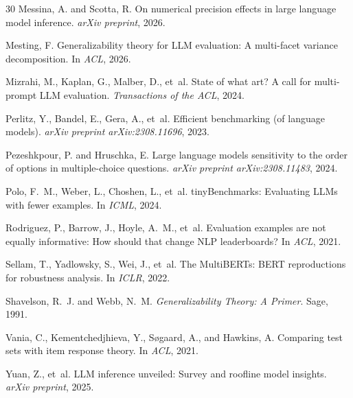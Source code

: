 \documentclass[letterpaper]{article}
\begin{document}
\begin{thebibliography}{30}
Messina, A. and Scotta, R.
\newblock On numerical precision effects in large language model inference.
\newblock \emph{arXiv preprint}, 2026.

Mesting, F.
\newblock Generalizability theory for LLM evaluation: A multi-facet variance decomposition.
\newblock In \emph{ACL}, 2026.

Mizrahi, M., Kaplan, G., Malber, D., et~al.
\newblock State of what art? A call for multi-prompt LLM evaluation.
\newblock \emph{Transactions of the ACL}, 2024.

Perlitz, Y., Bandel, E., Gera, A., et~al.
\newblock Efficient benchmarking (of language models).
\newblock \emph{arXiv preprint arXiv:2308.11696}, 2023.

Pezeshkpour, P. and Hruschka, E.
\newblock Large language models sensitivity to the order of options in multiple-choice questions.
\newblock \emph{arXiv preprint arXiv:2308.11483}, 2024.

Polo, F.~M., Weber, L., Choshen, L., et~al.
\newblock tinyBenchmarks: Evaluating LLMs with fewer examples.
\newblock In \emph{ICML}, 2024.

Rodriguez, P., Barrow, J., Hoyle, A.~M., et~al.
\newblock Evaluation examples are not equally informative: How should that change NLP leaderboards?
\newblock In \emph{ACL}, 2021.

Sellam, T., Yadlowsky, S., Wei, J., et~al.
\newblock The MultiBERTs: BERT reproductions for robustness analysis.
\newblock In \emph{ICLR}, 2022.

Shavelson, R.~J. and Webb, N.~M.
\newblock \emph{Generalizability Theory: A Primer}.
\newblock Sage, 1991.

Vania, C., Kementchedjhieva, Y., S{\o}gaard, A., and Hawkins, A.
\newblock Comparing test sets with item response theory.
\newblock In \emph{ACL}, 2021.

Yuan, Z., et~al.
\newblock LLM inference unveiled: Survey and roofline model insights.
\newblock \emph{arXiv preprint}, 2025.

\end{thebibliography}
\end{document}
